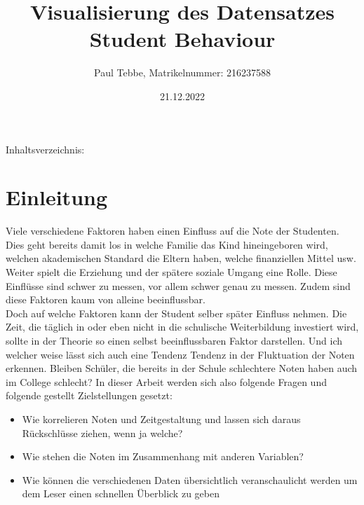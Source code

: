\documentclass[usegeometry=true]{scrartcl}
\begin{document}
\subject{Projektbericht zum Modul Information Retrieval und Visualisierung Sommersemester 2022}
\title{Visualisierung des Datensatzes Student Behaviour}
\author{Paul Tebbe, Matrikelnummer: 216237588}%
\date{21.12.2022}
\maketitle%
\pagebreak
Inhaltsverzeichnis:
\tableofcontents

\section{Einleitung}
\label{Einleitung}

Viele verschiedene Faktoren haben einen Einfluss auf die Note der Studenten. Dies geht bereits damit los in welche Familie das Kind hineingeboren wird, welchen akademischen Standard die Eltern haben, welche finanziellen Mittel usw. Weiter spielt die Erziehung und der spätere soziale Umgang eine Rolle. \cite{Earthman}
Diese Einflüsse sind schwer zu messen, vor allem schwer genau zu messen. Zudem sind diese Faktoren kaum von alleine beeinflussbar.\\
Doch auf welche Faktoren kann der Student selber später Einfluss nehmen. Die Zeit, die täglich in oder eben nicht in die schulische Weiterbildung investiert wird, sollte in der Theorie so einen selbst beeinflussbaren Faktor darstellen. Und ich welcher weise lässt sich auch eine Tendenz Tendenz in der Fluktuation der Noten erkennen. Bleiben Schüler, die bereits in der Schule schlechtere Noten haben auch im College schlecht?
In dieser Arbeit werden sich also folgende Fragen und folgende gestellt Zielstellungen gesetzt:

\begin{itemize}
\item Wie korrelieren Noten und Zeitgestaltung und lassen sich daraus Rückschlüsse ziehen, wenn ja welche? 
\item Wie stehen die Noten im Zusammenhang mit anderen Variablen?
\item Wie können die verschiedenen Daten übersichtlich veranschaulicht werden um dem Leser einen schnellen Überblick zu geben
\end{itemize}
\end{document}

